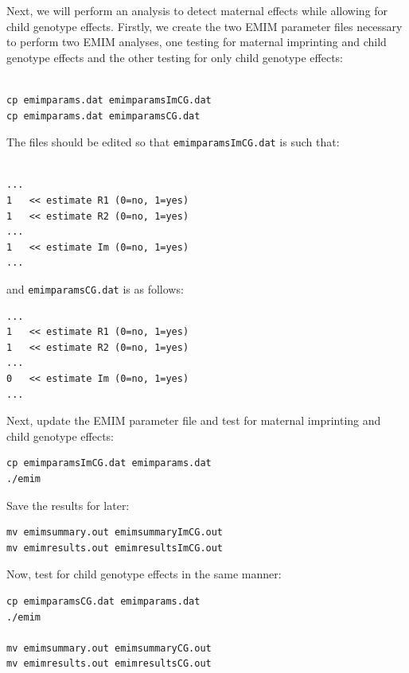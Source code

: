 \documentclass[a4paper,12pt]{article}
\newcommand{\code}[1]{{\footnotesize{{\tt #1}}}}
\begin{document}
Next, we will perform an analysis to detect maternal effects while allowing for child genotype effects. Firstly, we create the two EMIM parameter files necessary to perform two EMIM analyses, one testing for maternal imprinting and child genotype effects and the other testing for only child genotype effects: 
\vspace{0.35cm} \begin{lstlisting}

cp emimparams.dat emimparamsImCG.dat  
cp emimparams.dat emimparamsCG.dat 

\end{lstlisting} \vspace{0.35cm}
The files should be edited so that \code{emimparamsImCG.dat} is such that: 
\vspace{0.35cm} \begin{lstlisting}

...
1   << estimate R1 (0=no, 1=yes)
1   << estimate R2 (0=no, 1=yes)
...
1   << estimate Im (0=no, 1=yes)
...

\end{lstlisting} \vspace{0.35cm}
and \code{emimparamsCG.dat} is as follows: 
\vspace{0.35cm} \begin{lstlisting}
... 
1   << estimate R1 (0=no, 1=yes)
1   << estimate R2 (0=no, 1=yes)
...
0   << estimate Im (0=no, 1=yes)
...

\end{lstlisting} \vspace{0.35cm}
Next, update the EMIM parameter file and test for maternal imprinting and child genotype effects: 
\vspace{0.35cm} \begin{lstlisting}
cp emimparamsImCG.dat emimparams.dat
./emim

\end{lstlisting} \vspace{0.35cm}
Save the results for later: 
\vspace{0.35cm} \begin{lstlisting}
mv emimsummary.out emimsummaryImCG.out
mv emimresults.out emimresultsImCG.out

\end{lstlisting} \vspace{0.35cm}
Now, test for child genotype effects in the same manner: 
\vspace{0.35cm} \begin{lstlisting}
cp emimparamsCG.dat emimparams.dat
./emim

mv emimsummary.out emimsummaryCG.out
mv emimresults.out emimresultsCG.out

\end{lstlisting} \vspace{0.35cm}
\end{document}
